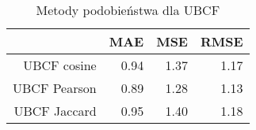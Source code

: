 \begin{table}[ht]
\centering
\begin{tabular}{rrrr}
  \hline
 & MAE & MSE & RMSE \\ 
  \hline
UBCF cosine & 0.94 & 1.37 & 1.17 \\ 
  UBCF Pearson & 0.89 & 1.28 & 1.13 \\ 
  UBCF Jaccard & 0.95 & 1.40 & 1.18 \\ 
   \hline
\end{tabular}
\caption{Metody podobieństwa dla UBCF} 
\end{table}

